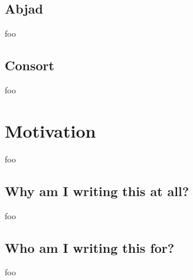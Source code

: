 \begin{singlespacing}
\vspace{-0.5\baselineskip}
\begin{multicols}{2}

\vfill
\columnbreak
\setlength\fboxsep{0pt}
\setlength\fboxrule{0.5pt}
\noindent{}
\end{multicols}
\end{singlespacing}

\subsection{Abjad}

foo

\subsection{Consort}

foo

\section{Motivation}

foo

\subsection{Why am I writing this at all?}

foo

\subsection{Who am I writing this for?}

foo